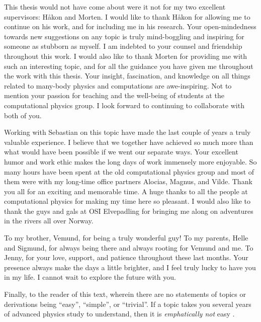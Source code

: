 This thesis would not have come about were it not for my two excellent
supervisors: Håkon and Morten.
I would like to thank Håkon for allowing me to continue on his work, and for
including me in his research.
Your open-mindedness towards new suggestions on any topic is truly mind-boggling
and inspiring for someone as stubborn as myself.
I am indebted to your counsel and friendship throughout this work.
I would also like to thank Morten for providing me with such an interesting
topic, and for all the guidance you have given me throughout the work with this
thesis.
Your insight, fascination, and knowledge on all things related to many-body
physics and computations are awe-inspiring.
Not to mention your passion for teaching and the well-being of students at the
computational physics group.
I look forward to continuing to collaborate with both of you.

Working with Sebastian on this topic have made the last couple of years a truly
valuable experience.
I believe that we together have achieved so much more than what would have been
possible if we went our separate ways.
Your excellent humor and work ethic makes the long days of work immensely more
enjoyable.
So many hours have been spent at the old computational physics group and most
of them were with my long-time office partners Alocias, Magnus, and Vilde.
Thank you all for an exciting and memorable time.
A huge thanks to all the people at computational physics for making my time here
so pleasant.
I would also like to thank the guys and gals at OSI Elvepadling for bringing me
along on adventures in the rivers all over Norway.

To my brother, Vemund, for being a truly wonderful guy!
To my parents, Helle and Sigmund, for always being there and always rooting for
Vemund and me.
To Jenny, for your love, support, and patience throughout these last months.
Your presence always make the days a little brighter, and I feel truly lucky to
have you in my life.
I cannot wait to explore the future with you.



Finally, to the reader of this text, wherein there are no statements of topics
or derivations being ``easy'', ``simple'', or ``trivial''.
If a topic takes you several years of advanced physics study to understand, then
it is \emph{emphatically not} easy \cite{nontrivial-manifesto}.
